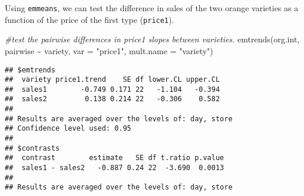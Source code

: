 \documentclass[
]{book}
\newenvironment{Shaded}{\begin{snugshade}}{\end{snugshade}}
\newcommand{\AttributeTok}[1]{\textcolor[rgb]{0.77,0.63,0.00}{#1}}
\newcommand{\CommentTok}[1]{\textcolor[rgb]{0.56,0.35,0.01}{\textit{#1}}}
\newcommand{\FunctionTok}[1]{\textcolor[rgb]{0.00,0.00,0.00}{#1}}
\newcommand{\NormalTok}[1]{#1}
\newcommand{\SpecialCharTok}[1]{\textcolor[rgb]{0.00,0.00,0.00}{#1}}
\newcommand{\StringTok}[1]{\textcolor[rgb]{0.31,0.60,0.02}{#1}}
\begin{document}
Using \texttt{emmeans}, we can test the difference in sales of the two orange varieties as a function of the price of the first type (\texttt{price1}).

\begin{Shaded}
\begin{Highlighting}[]
\CommentTok{\#test the pairwise differences in price1 slopes between varieties.}
\FunctionTok{emtrends}\NormalTok{(org.int, pairwise }\SpecialCharTok{\textasciitilde{}}\NormalTok{ variety, }\AttributeTok{var =} \StringTok{"price1"}\NormalTok{, }\AttributeTok{mult.name =} \StringTok{"variety"}\NormalTok{)}
\end{Highlighting}
\end{Shaded}

\begin{verbatim}
## $emtrends
##  variety price1.trend    SE df lower.CL upper.CL
##  sales1        -0.749 0.171 22   -1.104   -0.394
##  sales2         0.138 0.214 22   -0.306    0.582
## 
## Results are averaged over the levels of: day, store 
## Confidence level used: 0.95 
## 
## $contrasts
##  contrast        estimate   SE df t.ratio p.value
##  sales1 - sales2   -0.887 0.24 22  -3.690  0.0013
## 
## Results are averaged over the levels of: day, store
\end{verbatim}

  
\end{document}
